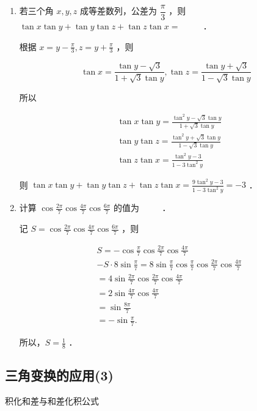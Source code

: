 \begin{enumerate}
\begin{jieda}
\end{jieda}


\item 若三个角 $x, y, z$ 成等差数列，公差为 $\dfrac{\pi}{3}$ ，则 $\tan x \tan y+\tan y \tan z+\tan z \tan x=$ $\qquad$ ．
\begin{jieda}
根据 $x=y-\frac{\pi}{3}, z=y+\frac{\pi}{3}$ ，则

$$
\tan x=\frac{\tan y-\sqrt{3}}{1+\sqrt{3} \tan y}, \tan z=\frac{\tan y+\sqrt{3}}{1-\sqrt{3} \tan y}
$$


所以

$$
\begin{aligned}
& \tan x \tan y=\frac{\tan ^2 y-\sqrt{3} \tan y}{1+\sqrt{3} \tan y} \\
& \tan y \tan z=\frac{\tan ^2 y+\sqrt{3} \tan y}{1-\sqrt{3} \tan y} \\
& \tan z \tan x=\frac{\tan ^2 y-3}{1-3 \tan ^2 y}
\end{aligned}
$$


则 $\tan x \tan y+\tan y \tan z+\tan z \tan x=\frac{9 \tan ^2 y-3}{1-3 \tan ^2 y}=-3$ ．
\end{jieda}
\item 计算 $\cos \frac{2 \pi}{7} \cos \frac{4 \pi}{7} \cos \frac{6 \pi}{7}$ 的值为 $\qquad$ ．
\begin{jieda}
    记 $S=\cos \frac{2 \pi}{7} \cos \frac{4 \pi}{7} \cos \frac{6 \pi}{7}$ ，则

$$
\begin{aligned}
& S=-\cos \frac{\pi}{7} \cos \frac{2 \pi}{7} \cos \frac{4 \pi}{7} \\
& -S \cdot 8 \sin \frac{\pi}{7}=8 \sin \frac{\pi}{7} \cos \frac{\pi}{7} \cos \frac{2 \pi}{7} \cos \frac{4 \pi}{7} \\
& =4 \sin \frac{2 \pi}{7} \cos \frac{2 \pi}{7} \cos \frac{4 \pi}{7} \\
& =2 \sin \frac{4 \pi}{7} \cos \frac{4 \pi}{7} \\
& =\sin \frac{8 \pi}{7} \\
& =-\sin \frac{\pi}{7} .
\end{aligned}
$$


所以，$S=\frac{1}{8}$ ．
\end{jieda}
\end{enumerate}

\clearpage
\subsection{三角变换的应用(3)}
\zsd 积化和差与和差化积公式

